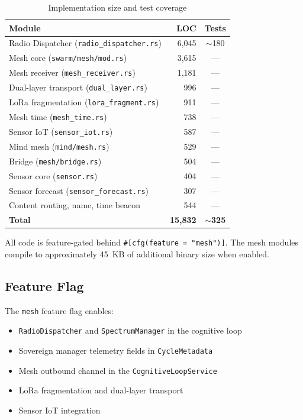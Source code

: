 \documentclass[11pt,twocolumn]{article}
\begin{document}
\begin{table}[H]
\centering
\caption{Implementation size and test coverage}
\label{tab:implementation}
\scriptsize
\begin{tabular}{@{}lrc@{}}
\toprule
\textbf{Module} & \textbf{LOC} & \textbf{Tests} \\
\midrule
Radio Dispatcher (\texttt{radio\_dispatcher.rs}) & 6,045 & $\sim$180 \\
Mesh core (\texttt{swarm/mesh/mod.rs}) & 3,615 & --- \\
Mesh receiver (\texttt{mesh\_receiver.rs}) & 1,181 & --- \\
Dual-layer transport (\texttt{dual\_layer.rs}) & 996 & --- \\
LoRa fragmentation (\texttt{lora\_fragment.rs}) & 911 & --- \\
Mesh time (\texttt{mesh\_time.rs}) & 738 & --- \\
Sensor IoT (\texttt{sensor\_iot.rs}) & 587 & --- \\
Mind mesh (\texttt{mind/mesh.rs}) & 529 & --- \\
Bridge (\texttt{mesh/bridge.rs}) & 504 & --- \\
Sensor core (\texttt{sensor.rs}) & 404 & --- \\
Sensor forecast (\texttt{sensor\_forecast.rs}) & 307 & --- \\
Content routing, name, time beacon & 544 & --- \\
\midrule
\textbf{Total} & \textbf{15,832} & \textbf{$\sim$325} \\
\bottomrule
\end{tabular}
\end{table}

All code is feature-gated behind \texttt{\#[cfg(feature = "mesh")]}.
The mesh modules compile to approximately 45~KB of additional binary
size when enabled.

\subsection{Feature Flag}

The \texttt{mesh} feature flag enables:
\begin{itemize}[nosep]
  \item \texttt{RadioDispatcher} and \texttt{SpectrumManager} in the
    cognitive loop
  \item Sovereign manager telemetry fields in \texttt{CycleMetadata}
  \item Mesh outbound channel in the \texttt{CognitiveLoopService}
  \item LoRa fragmentation and dual-layer transport
  \item Sensor IoT integration
\end{itemize}
\end{document}
